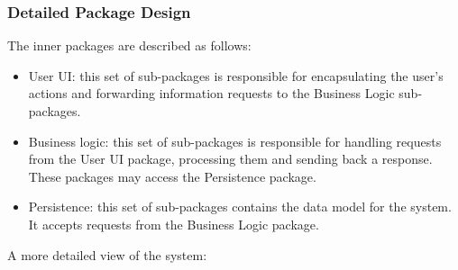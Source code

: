 \documentclass[a4paper,11pt]{report} %
\begin{document}
	\subsubsection{Detailed Package Design}
	The inner packages are described as follows:\\
	\begin{itemize}
		\item User UI:	this set of sub-packages is responsible for encapsulating the user's actions and forwarding information requests to the Business Logic sub-packages.
		\item Business logic: this set of sub-packages is responsible for handling requests from the User UI package, processing them and sending back a response. These packages may access the Persistence package.
		\item Persistence: this set of sub-packages contains the data model for the system. It accepts requests from the Business Logic package.
	\end{itemize}
	A more detailed view of the system:\\
\end{document}
